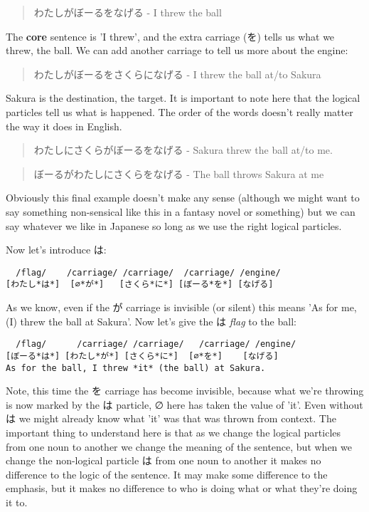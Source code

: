 \documentclass[11pt]{article}
\begin{document}
\begin{quote}
わたしがぼーるをなげる - I threw the ball
\end{quote}
The \textbf{core} sentence is 'I threw', and the extra carriage (を) tells us what we threw, the ball. We can add another carriage to tell us more about the engine:
\begin{quote}
わたしがぼーるをさくらになげる - I threw the ball at/to Sakura
\end{quote}
Sakura is the destination, the target. It is important to note here that the logical particles tell us what is happened. The order of the words doesn't really matter the way it does in English.
\begin{quote}
わたしにさくらがぼーるをなげる - Sakura threw the ball at/to me.
\end{quote}
\begin{quote}
ぼーるがわたしにさくらをなげる - The ball throws Sakura at me
\end{quote}
Obviously this final example doesn't make any sense (although we might want to say something non-sensical like this in a fantasy novel or something) but we can say whatever we like in Japanese so long as we use the right logical particles.

Now let's introduce は:
\begin{verbatim}
  /flag/    /carriage/ /carriage/  /carriage/ /engine/
[わたし*は*]  [∅*が*]   [さくら*に*] [ぼーる*を*] [なげる]
\end{verbatim}
As we know, even if the が carriage is invisible (or silent) this means 'As for me, (I) threw the ball at Sakura'. Now let's give the は \emph{flag} to the ball:
\begin{verbatim}
  /flag/      /carriage/ /carriage/   /carriage/ /engine/
[ぼーる*は*] [わたし*が*] [さくら*に*]  [∅*を*]    [なげる]
As for the ball, I threw *it* (the ball) at Sakura.
\end{verbatim}
Note, this time the を carriage has become invisible, because what we're throwing is now marked by the は particle, ∅ here has taken the value of 'it'. Even without は we might already know what 'it' was that was thrown from context. The important thing to understand here is that as we change the logical particles from one noun to another we change the meaning of the sentence, but when we change the non-logical particle は from one noun to another it makes no difference to the logic of the sentence. It may make some difference to the emphasis, but it makes no difference to who is doing what or what they're doing it to.
\end{document}
